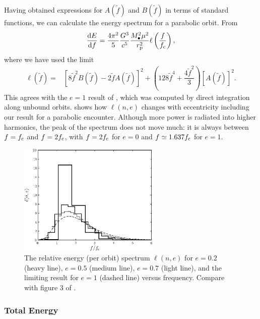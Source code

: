 Having obtained expressions for $A(\tilde{f})$ and $B(\tilde{f})$ in terms of standard functions, we can calculate the energy spectrum for a parabolic orbit. From 
\begin{equation}
\dfrac{\mathrm{d} {E}}{\mathrm{d} {f}} = \dfrac{4\pi^2}{5}\dfrac{G^3}{c^5}\dfrac{M_\bullet^2\mu^2}{r_\mathrm{p}^2}\ell\left(\dfrac{f}{f_\mathrm{c}}\right),
\label{eq:PM_dEdf}
\end{equation}
where we have used the limit
\begin{align}
\ell(\tilde{f})  = {} & \left[8\tilde{f}^2B(\tilde{f}) - 2\tilde{f}A(\tilde{f})\right]^2 + \left(128\tilde{f}^4 + \dfrac{4\tilde{f}^2}{3}\right)\left[A(\tilde{f})\right]^2.
\label{eq:ell}
\end{align}
This agrees with the $e = 1$ result of \citet{Turner1977}, which was computed by direct integration along unbound orbits.  shows how $\ell(n,e)$ changes with eccentricity including our result for a parabolic encounter. Although more power is radiated into higher harmonics, the peak of the spectrum does not move much: it is always between $f = f_\mathrm{c}$ and $f = 2 f_\mathrm{c}$, with $f = 2 f_\mathrm{c}$ for $e = 0$ and $f \simeq 1.637 f_\mathrm{c}$ for $e = 1$.
\begin{figure}%
\centering
\includegraphics[width=0.6\textwidth]{./images/Fig_ell}
\caption{The relative energy (per orbit) spectrum $\ell(n,e)$ for $e = 0.2$ (heavy line), $e = 0.5$ (medium line), $e = 0.7$ (light line), and the limiting result for $e = 1$ (dashed line) versus frequency. Compare with figure 3 of \citet{Peters1963}.}
\label{fig:ell}
\end{figure}

\subsubsection{Total Energy}

